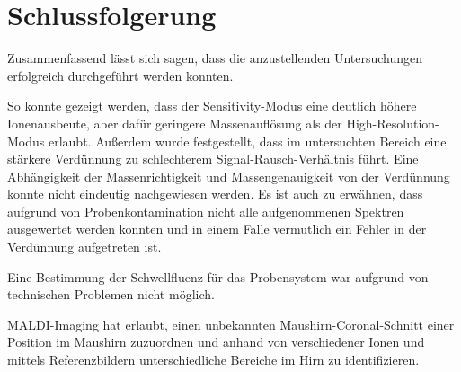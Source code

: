 \newpage
\section{Schlussfolgerung}

  Zusammenfassend lässt sich sagen, dass die anzustellenden Untersuchungen erfolgreich durchgeführt werden konnten.

  So konnte gezeigt werden, dass der Sensitivity-Modus eine deutlich höhere Ionenausbeute, aber dafür geringere Massenauflösung als der High-Resolution-Modus erlaubt.
  Außerdem wurde festgestellt, dass im untersuchten Bereich eine stärkere Verdünnung zu schlechterem Signal-Rausch-Verhältnis führt.
  Eine Abhängigkeit der Massenrichtigkeit und Massengenauigkeit von der Verdünnung konnte nicht eindeutig nachgewiesen werden.
  Es ist auch zu erwähnen, dass aufgrund von Probenkontamination nicht alle aufgenommenen Spektren ausgewertet werden konnten und in einem Falle vermutlich ein Fehler in der Verdünnung aufgetreten ist.

  Eine Bestimmung der Schwellfluenz für das Probensystem war aufgrund von technischen Problemen nicht möglich.

  MALDI-Imaging hat erlaubt, einen unbekannten Maushirn-Coronal-Schnitt einer Position im Maushirn zuzuordnen und anhand von verschiedener Ionen und mittels Referenzbildern unterschiedliche Bereiche im Hirn zu identifizieren.
